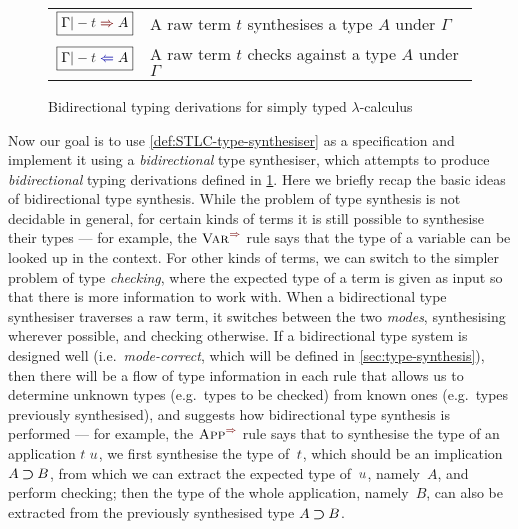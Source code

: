 \begin{figure}
  \small
  \bgroup
  \renewcommand{\arraystretch}{1.5}
  \begin{tabular}{ r l }
    $\boxed{\Gamma |- \isTerm{t} \syn A}$ & A raw term $t$ synthesises a type $A$ under $\Gamma$ \\
    $\boxed{\Gamma |- \isTerm{t} \chk A}$ &A raw term $t$ checks against a type $A$ under $\Gamma$
  \end{tabular}
  \egroup
  \centering
  \caption{Bidirectional typing derivations for simply typed $\lambda$-calculus}
  \label{fig:STLC-bidirectional-typing-derivations}
\end{figure}

Now our goal is to use \cref{def:STLC-type-synthesiser} as a specification and implement it using a \emph{bidirectional} type synthesiser, which attempts to produce \emph{bidirectional} typing derivations defined in \cref{fig:STLC-bidirectional-typing-derivations}.
Here we briefly recap the basic ideas of bidirectional type synthesis.
While the problem of type synthesis is not decidable in general, for certain kinds of terms it is still possible to synthesise their types --- for example, the $\SynRule{Var}$ rule says that the type of a variable can be looked up in the context.
For other kinds of terms, we can switch to the simpler problem of type \emph{checking}, where the expected type of a term is given as input so that there is more information to work with.
When a bidirectional type synthesiser traverses a raw term, it switches between the two \emph{modes}, synthesising wherever possible, and checking otherwise.
If a bidirectional type system is designed well (i.e.~\emph{mode-correct}, which will be defined in \cref{sec:type-synthesis}), then there will be a flow of type information in each rule that allows us to determine unknown types (e.g.~types to be checked) from known ones (e.g.~types previously synthesised), and suggests how bidirectional type synthesis is performed --- for example, the $\SynRule{App}$ rule says that to synthesise the type of an application $\isTerm{t\;u}$, we first synthesise the type of~$\isTerm{t}$, which should be an implication $A \mathbin{\bm{\supset}} B$, from which we can extract the expected type of~$\isTerm{u}$, namely~$A$, and perform checking; then the type of the whole application, namely~$B$, can also be extracted from the previously synthesised type $A \mathbin{\bm{\supset}} B$.

